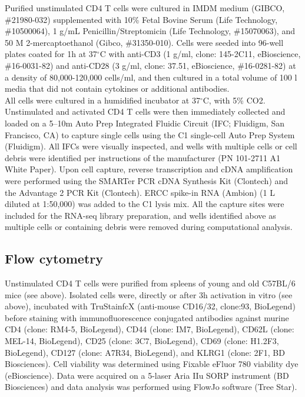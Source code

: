 Purified unstimulated CD4\plus{} T cells were cultured in IMDM medium (GIBCO, \#{}21980-032) supplemented with 10\% Fetal Bovine Serum (Life Technology, \#{}10500064), 1 \textmu{}g/mL Penicillin/Streptomicin (Life Technology, \#{}15070063), and 50 \textmu{}M 2-mercaptoethanol (Gibco, \#{}31350-010). 
Cells were seeded into 96-well plates coated for 1h at 37$^\circ$C with anti-CD3\textepsilon{} (1 \textmu{}g/ml, clone: 145-2C11, eBioscience, \#{}16-0031-82) and anti-CD28 (3 \textmu{}g/ml, clone: 37.51, eBioscience, \#{}16-0281-82) at a density of 80,000-120,000 cells/ml, and then cultured in a total volume of 100 \textmu{}l media that did not contain cytokines or additional antibodies.  \\

All cells were cultured in a humidified incubator at 37$^\circ$C, with 5\% CO2. Unstimulated and activated CD4\plus{} T cells were then immediately collected and loaded on a 5–10\textmu{}m Auto Prep Integrated Fluidic Circuit (IFC; Fluidigm, San Francisco, CA) to capture single cells using the C1 single-cell Auto Prep System (Fluidigm). 
All IFCs were visually inspected, and wells with multiple cells or cell debris were identified per instructions of the manufacturer (PN 101-2711 A1 White Paper). 
Upon cell capture, reverse transcription and cDNA amplification were performed using the SMARTer PCR cDNA Synthesis Kit (Clontech) and the Advantage 2 PCR Kit (Clontech). 
ERCC spike-in RNA (Ambion) (1 \textmu{}L diluted at 1:50,000) was added to the C1 lysis mix. 
All the capture sites were included for the RNA-seq library preparation, and wells identified above as multiple cells or containing debris were removed during computational analysis.

\subsection{Flow cytometry}
\label{appA.1:FACS}

Unstimulated CD4\plus{} T cells were purified from spleens of young and old C57BL/6 mice (see above). 
Isolated cells were, directly or after 3h activation in vitro (see above), incubated with TruStainfcX (anti-mouse CD16/32, clone:93, BioLegend) before staining with immunofluorescence conjugated antibodies against murine CD4 (clone: RM4-5, BioLegend), CD44 (clone: IM7, BioLegend), CD62L (clone: MEL-14, BioLegend), CD25 (clone: 3C7, BioLegend), CD69 (clone: H1.2F3, BioLegend), CD127 (clone: A7R34, BioLegend), and KLRG1 (clone: 2F1, BD Biosciences). 
Cell viability was determined using Fixable eFluor 780 viability dye (eBioscience). 
Data were acquired on a 5-laser Aria IIu SORP instrument (BD Biosciences) and data analysis was performed using FlowJo software (Tree Star).\\

